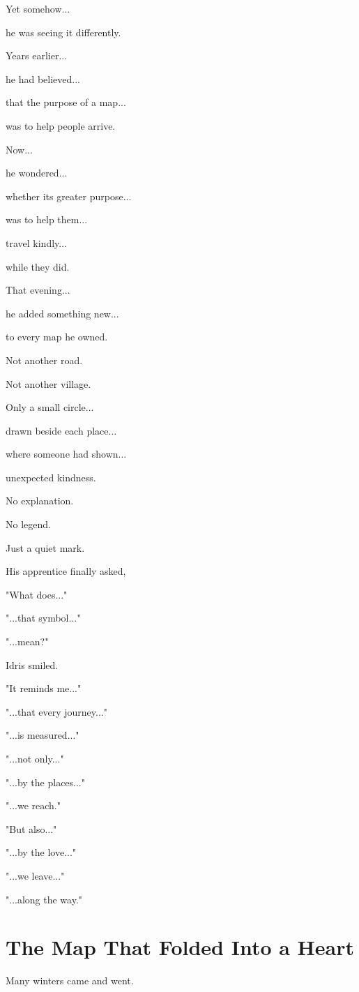\documentclass[12pt,openany]{book}
\begin{document}
Yet somehow...

he was seeing it differently.

Years earlier...

he had believed...

that the purpose of a map...

was to help people arrive.

Now...

he wondered...

whether its greater purpose...

was to help them...

travel kindly...

while they did.

That evening...

he added something new...

to every map he owned.

Not another road.

Not another village.

Only a small circle...

drawn beside each place...

where someone had shown...

unexpected kindness.

No explanation.

No legend.

Just a quiet mark.

His apprentice finally asked,

"What does..."

"...that symbol..."

"...mean?"

Idris smiled.

"It reminds me..."

"...that every journey..."

"...is measured..."

"...not only..."

"...by the places..."

"...we reach."

"But also..."

"...by the love..."

"...we leave..."

"...along the way."
\section*{The Map That Folded Into a Heart}

Many winters came and went.
\end{document}
